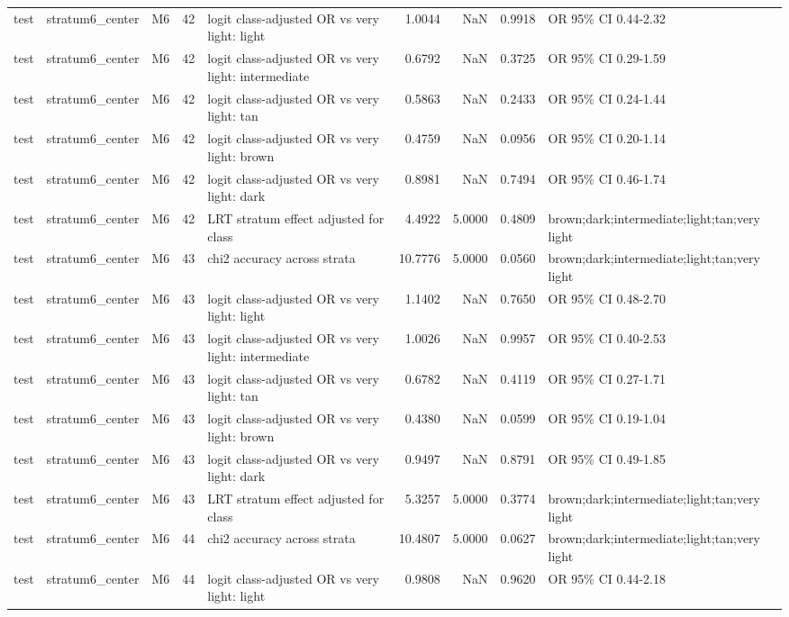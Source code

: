 \begin{tabular}{lllrlrrrl}
test & stratum6\_center & M6 & 42 & logit class-adjusted OR vs very light: light & 1.0044 & NaN & 0.9918 & OR 95\% CI 0.44-2.32 \\
test & stratum6\_center & M6 & 42 & logit class-adjusted OR vs very light: intermediate & 0.6792 & NaN & 0.3725 & OR 95\% CI 0.29-1.59 \\
test & stratum6\_center & M6 & 42 & logit class-adjusted OR vs very light: tan & 0.5863 & NaN & 0.2433 & OR 95\% CI 0.24-1.44 \\
test & stratum6\_center & M6 & 42 & logit class-adjusted OR vs very light: brown & 0.4759 & NaN & 0.0956 & OR 95\% CI 0.20-1.14 \\
test & stratum6\_center & M6 & 42 & logit class-adjusted OR vs very light: dark & 0.8981 & NaN & 0.7494 & OR 95\% CI 0.46-1.74 \\
test & stratum6\_center & M6 & 42 & LRT stratum effect adjusted for class & 4.4922 & 5.0000 & 0.4809 & brown;dark;intermediate;light;tan;very light \\
test & stratum6\_center & M6 & 43 & chi2 accuracy across strata & 10.7776 & 5.0000 & 0.0560 & brown;dark;intermediate;light;tan;very light \\
test & stratum6\_center & M6 & 43 & logit class-adjusted OR vs very light: light & 1.1402 & NaN & 0.7650 & OR 95\% CI 0.48-2.70 \\
test & stratum6\_center & M6 & 43 & logit class-adjusted OR vs very light: intermediate & 1.0026 & NaN & 0.9957 & OR 95\% CI 0.40-2.53 \\
test & stratum6\_center & M6 & 43 & logit class-adjusted OR vs very light: tan & 0.6782 & NaN & 0.4119 & OR 95\% CI 0.27-1.71 \\
test & stratum6\_center & M6 & 43 & logit class-adjusted OR vs very light: brown & 0.4380 & NaN & 0.0599 & OR 95\% CI 0.19-1.04 \\
test & stratum6\_center & M6 & 43 & logit class-adjusted OR vs very light: dark & 0.9497 & NaN & 0.8791 & OR 95\% CI 0.49-1.85 \\
test & stratum6\_center & M6 & 43 & LRT stratum effect adjusted for class & 5.3257 & 5.0000 & 0.3774 & brown;dark;intermediate;light;tan;very light \\
test & stratum6\_center & M6 & 44 & chi2 accuracy across strata & 10.4807 & 5.0000 & 0.0627 & brown;dark;intermediate;light;tan;very light \\
test & stratum6\_center & M6 & 44 & logit class-adjusted OR vs very light: light & 0.9808 & NaN & 0.9620 & OR 95\% CI 0.44-2.18 \\

\end{tabular}
